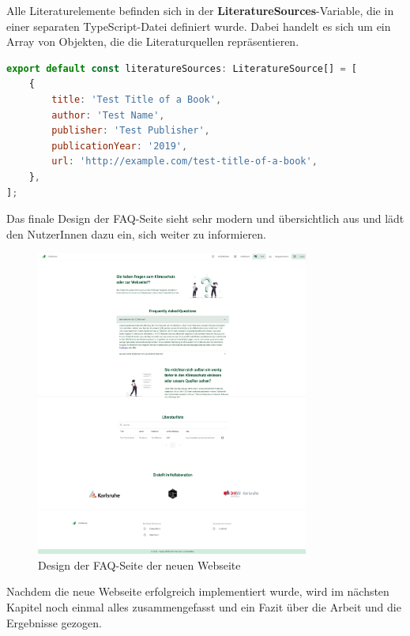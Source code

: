 Alle Literaturelemente befinden sich in der \textbf{LiteratureSources}-Variable, die in einer separaten TypeScript-Datei definiert wurde. Dabei handelt es sich um ein Array von Objekten, die die Literaturquellen repräsentieren.

\begin{lstlisting}[language={JavaScript}, caption={Literaturelemente}]
export default const literatureSources: LiteratureSource[] = [
    {
        title: 'Test Title of a Book',
        author: 'Test Name',
        publisher: 'Test Publisher',
        publicationYear: '2019',
        url: 'http://example.com/test-title-of-a-book',
    },
];
\end{lstlisting}

Das finale Design der FAQ-Seite sieht sehr modern und übersichtlich aus und lädt den NutzerInnen dazu ein, sich weiter zu informieren.

\begin{figure}[H]
    \centering
    \includegraphics[width=0.8\textwidth]{images/06/FAQ-Design.jpeg}
    \caption{Design der FAQ-Seite der neuen Webseite}
    \label{fig:new-co2runter-faq-design}
\end{figure}


Nachdem die neue Webseite erfolgreich implementiert wurde, wird im nächsten Kapitel noch einmal alles zusammengefasst und ein Fazit über die Arbeit und die Ergebnisse gezogen.
